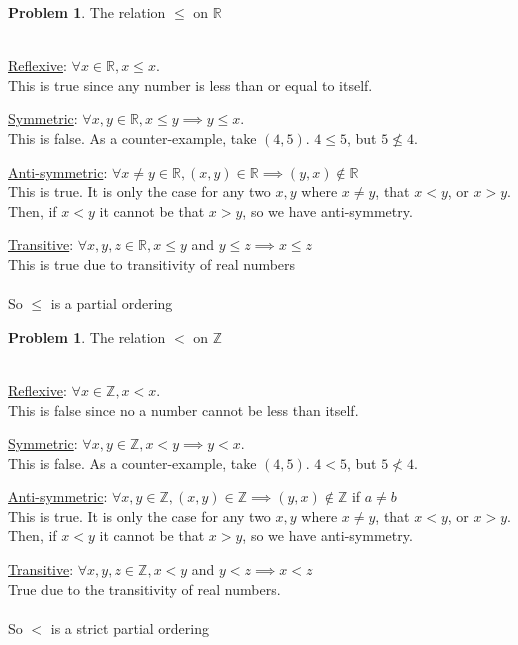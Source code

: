 \documentclass[10pt,leqno ]{article}
\theoremstyle{definition}
\newtheorem{problem}[theorem]{Problem}
\begin{document}
\begin{problem} The relation $\leq$ on $\mathbb{R}$
\\\\
\Large
\item \underline{Reflexive}: $\forall x \in \mathbb{R}, x \leq x$.  \\
This is true since any number is less than or equal to itself.\\
\item \underline{Symmetric}: $\forall x,y \in \mathbb{R}, x \leq y \implies y \leq x$.  \\
This is false.  As a counter-example, take $(4, 5)$.  $4 \leq 5$, but $5 \not\leq 4$. \\
\item \underline{Anti-symmetric}: $\forall x \neq y \in \mathbb{R}, (x, y) \in \mathbb{R} \implies (y, x) \notin \mathbb{R}$\\
This is true.  It is only the case for any two $x, y$ where $x \neq y$, that $x < y$, or $x > y.$  Then, if $x < y$ it cannot be that $x > y$, so we have anti-symmetry.
\\
\item \underline{Transitive}: $\forall x,y,z \in \mathbb{R}, x \leq y$ and $y \leq z \implies x \leq z$\\
This is true due to transitivity of real numbers
\\\\
So  $\leq$ is a partial ordering
\end{problem}
\newpage

\begin{problem}  The relation $<$ on $\mathbb{Z}$
\\\\
\Large
\item \underline{Reflexive}: $\forall x \in \mathbb{Z}, x < x$.  \\
This is false since no a number cannot be less than itself.\\
\item \underline{Symmetric}: $\forall x,y \in \mathbb{Z}, x < y \implies y < x$.  \\
This is false.  As a counter-example, take $(4, 5)$.  $4 < 5$, but $5 \nless 4$. \\
\item \underline{Anti-symmetric}: $\forall x,y \in \mathbb{Z}, (x, y) \in \mathbb{Z} \implies (y, x) \notin \mathbb{Z}$ if $a \neq b$\\
This is true.  It is only the case for any two $x, y$ where $x \neq y$, that $x < y$, or $x > y.$  Then, if $x < y$ it cannot be that $x > y$, so we have anti-symmetry.
\\
\item \underline{Transitive}: $\forall x,y,z \in \mathbb{Z}, x < y$ and $y < z \implies x < z$
\\
True due to the transitivity of real numbers.
\\\\
So $<$ is a strict partial ordering
\end{problem}
\newpage
\end{document}
